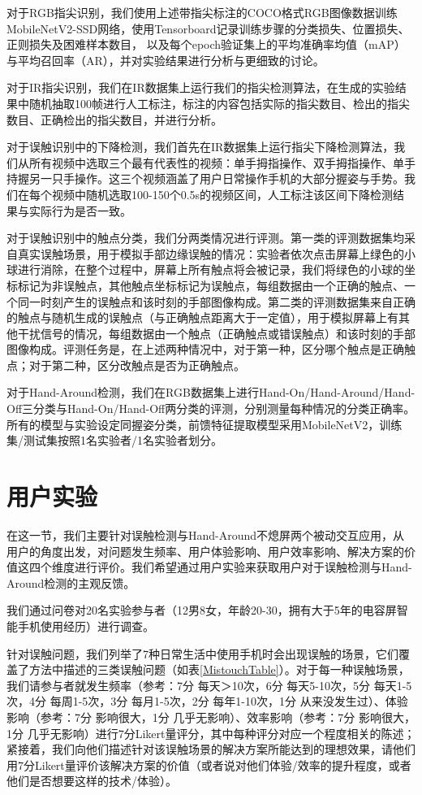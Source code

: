 对于RGB指尖识别，我们使用上述带指尖标注的COCO格式RGB图像数据训练MobileNetV2-SSD网络，使用Tensorboard记录训练步骤的分类损失、位置损失、正则损失及困难样本数目，
以及每个epoch验证集上的平均准确率均值（mAP）与平均召回率（AR），并对实验结果进行分析与更细致的讨论。

对于IR指尖识别，我们在IR数据集上运行我们的指尖检测算法，在生成的实验结果中随机抽取100帧进行人工标注，标注的内容包括实际的指尖数目、检出的指尖数目、正确检出的指尖数目，并进行分析。

对于误触识别中的下降检测，我们首先在IR数据集上运行指尖下降检测算法，我们从所有视频中选取三个最有代表性的视频：单手拇指操作、双手拇指操作、单手持握另一只手操作。这三个视频涵盖了用户日常操作手机的大部分握姿与手势。我们在每个视频中随机选取100-150个0.5s的视频区间，人工标注该区间下降检测结果与实际行为是否一致。



对于误触识别中的触点分类，我们分两类情况进行评测。第一类的评测数据集均采自真实误触场景，用于模拟手部边缘误触的情况：实验者依次点击屏幕上绿色的小球进行消除，在整个过程中，屏幕上所有触点将会被记录，我们将绿色的小球的坐标标记为非误触点，其他触点坐标标记为误触点，每组数据由一个正确的触点、一个同一时刻产生的误触点和该时刻的手部图像构成。第二类的评测数据集来自正确的触点与随机生成的误触点（与正确触点距离大于一定值），用于模拟屏幕上有其他干扰信号的情况，每组数据由一个触点（正确触点或错误触点）和该时刻的手部图像构成。评测任务是，在上述两种情况中，对于第一种，区分哪个触点是正确触点；对于第二种，区分改触点是否为正确触点。

对于Hand-Around检测，我们在RGB数据集上进行Hand-On/Hand-Around/Hand-Off三分类与Hand-On/Hand-Off两分类的评测，分别测量每种情况的分类正确率。所有的模型与实验设定同握姿分类，前馈特征提取模型采用MobileNetV2，训练集/测试集按照1名实验者/1名实验者划分。

\section{用户实验}

在这一节，我们主要针对误触检测与Hand-Around不熄屏两个被动交互应用，从用户的角度出发，对问题发生频率、用户体验影响、用户效率影响、解决方案的价值这四个维度进行评价。我们希望通过用户实验来获取用户对于误触检测与Hand-Around检测的主观反馈。

我们通过问卷对20名实验参与者（12男8女，年龄20-30，拥有大于5年的电容屏智能手机使用经历）进行调查。

针对误触问题，我们列举了7种日常生活中使用手机时会出现误触的场景，它们覆盖了方法中描述的三类误触问题（如表\ref{MistouchTable}）。对于每一种误触场景，我们请参与者就发生频率（参考：7分 每天＞10次，6分 每天5-10次，5分 每天1-5次，4分 每周1-5次，3分 每月1-5次，2分 每年1-10次，1分 从来没发生过）、体验影响（参考：7分 影响很大，1分 几乎无影响）、效率影响（参考：7分 影响很大，1分 几乎无影响）进行7分Likert量评分，其中每种评分对应一个程度相关的陈述；紧接着，我们向他们描述针对该误触场景的解决方案所能达到的理想效果，请他们用7分Likert量评价该解决方案的价值（或者说对他们体验/效率的提升程度，或者他们是否想要这样的技术/体验）。

